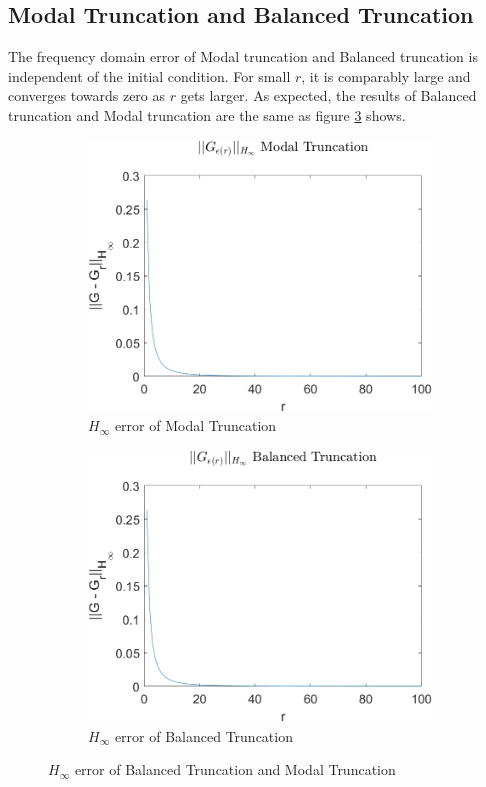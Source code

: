\subsection{Modal Truncation and Balanced Truncation}
The frequency domain error of Modal truncation and Balanced truncation is independent of the initial condition.
For small \(r\), it is comparably large and converges towards zero as \(r\) gets larger.
As expected, the results of Balanced truncation and Modal truncation are the same as figure \ref{FIG-H-BTMT} shows.
\begin{figure}[H]
\begin{subfigure}[b]{0.5\textwidth}
\centering
\includegraphics[width=\textwidth]{images/freq/H_MT}
\caption{$H_{\infty}$ error of Modal Truncation}
\label{FIG-H-MT}
\end{subfigure}
\begin{subfigure}[b]{0.5\textwidth}
\centering
\includegraphics[width=\textwidth]{images/freq/H_BT}
\caption{$H_{\infty}$ error of Balanced Truncation}
\label{FIG-H-BT}
\end{subfigure}
\caption{$H_{\infty}$ error of Balanced Truncation and Modal Truncation}
\label{FIG-H-BTMT}
\end{figure}


